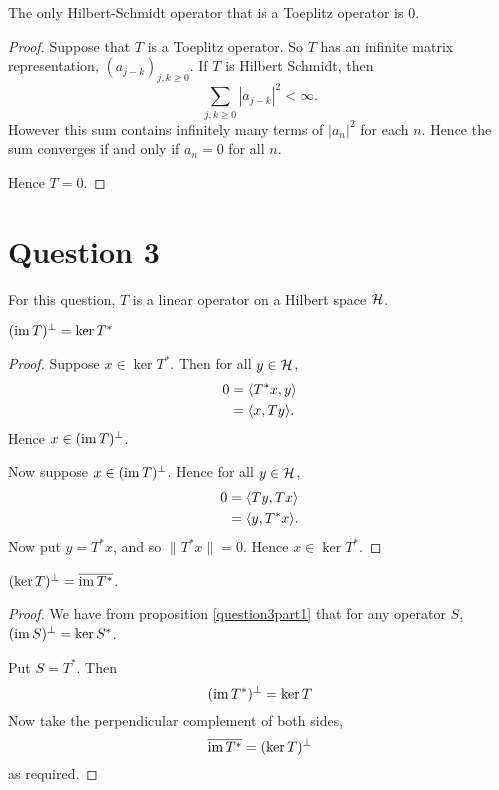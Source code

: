\documentclass{unswmaths}
\begin{document}
\begin{theorem}
    The only Hilbert-Schmidt operator that is a Toeplitz operator
    is $0$.
\end{theorem}
\begin{proof}
    Suppose that $T$ is a Toeplitz operator. So $T$ has an infinite matrix
    representation, $(a_{j-k})_{j,k\geq 0}$. If $T$ is Hilbert Schmidt, then
    \begin{equation*}
        \sum_{j,k\geq 0} |a_{j-k}|^2 < \infty.
    \end{equation*}
    However this sum contains infinitely many terms of $|a_n|^2$ for each $n$.
    Hence the sum converges if and only if $a_n = 0$ for all $n$.
    
    Hence $T = 0$.
\end{proof} 
\section*{Question 3}
For this question, $T$ is a linear operator
on a Hilbert space $\mathcal{H}$.
\begin{proposition}
\label{question3part1}
    $(\operatorname{im} T)^\perp = \ker T^*$
\end{proposition}
\begin{proof}
    Suppose $x \in \ker T^*$. Then for all $y \in \mathcal{H}$,
    \begin{align*}
        0 &= \langle T^*x,y\rangle\\
          &= \langle x,Ty\rangle.
    \end{align*}
    Hence $x \in (\operatorname{im} T)^\perp$. 
    
    Now suppose $x \in (\operatorname{im} T)^\perp$. Hence for all
    $y \in \mathcal{H}$, 
    \begin{align*}
        0 &= \langle Ty,Tx\rangle\\
        &= \langle y,T^*x\rangle.
    \end{align*}
    Now put $y = T^*x$, and so $\| T^*x\| = 0$. Hence
    $x \in \ker T^*$.
\end{proof}
\begin{proposition}
    $(\ker T)^\perp = \overline{\operatorname{im} T^*}$.
\end{proposition}
\begin{proof}
    We have from proposition \ref{question3part1} that for
    any operator $S$, $(\operatorname{im} S)^\perp = \ker S^*$.
    
    Put $S = T^*$. Then
    \begin{equation*}
        (\operatorname{im} T^*)^\perp = \ker T
    \end{equation*}
    Now take the perpendicular complement of both
    sides,
    \begin{equation*}
        \overline{\operatorname{im} T^*} = (\ker T)^\perp
    \end{equation*}
    as required.
\end{proof}
\end{document}
